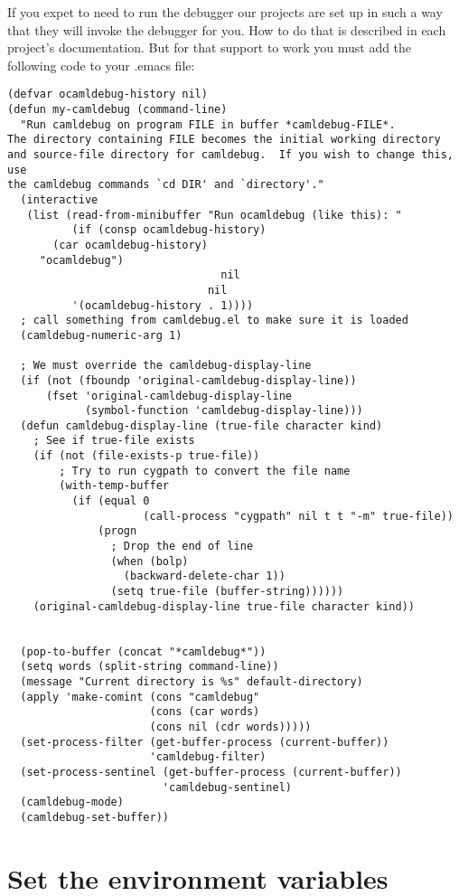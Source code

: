 \documentclass{article}
\begin{document}
 If you expet to need to run the debugger our projects are set up in such a
way that they will invoke the debugger for you. How to do that is described in
each project's documentation. But for that support to work you must add the
following code to your .emacs file:
\begin{verbatim}
(defvar ocamldebug-history nil)
(defun my-camldebug (command-line)
  "Run camldebug on program FILE in buffer *camldebug-FILE*.
The directory containing FILE becomes the initial working directory
and source-file directory for camldebug.  If you wish to change this, use
the camldebug commands `cd DIR' and `directory'."
  (interactive
   (list (read-from-minibuffer "Run ocamldebug (like this): "
          (if (consp ocamldebug-history)
       (car ocamldebug-history)
     "ocamldebug")
                                 nil
                               nil
          '(ocamldebug-history . 1))))
  ; call something from camldebug.el to make sure it is loaded
  (camldebug-numeric-arg 1)

  ; We must override the camldebug-display-line
  (if (not (fboundp 'original-camldebug-display-line))
      (fset 'original-camldebug-display-line 
            (symbol-function 'camldebug-display-line)))
  (defun camldebug-display-line (true-file character kind)
    ; See if true-file exists
    (if (not (file-exists-p true-file))
        ; Try to run cygpath to convert the file name
        (with-temp-buffer
          (if (equal 0 
                     (call-process "cygpath" nil t t "-m" true-file))
              (progn
                ; Drop the end of line
                (when (bolp)
                  (backward-delete-char 1))
                (setq true-file (buffer-string))))))
    (original-camldebug-display-line true-file character kind))


  (pop-to-buffer (concat "*camldebug*"))
  (setq words (split-string command-line)) 
  (message "Current directory is %s" default-directory)
  (apply 'make-comint (cons "camldebug"
                      (cons (car words)
                      (cons nil (cdr words)))))
  (set-process-filter (get-buffer-process (current-buffer))
                      'camldebug-filter)
  (set-process-sentinel (get-buffer-process (current-buffer))
                        'camldebug-sentinel)
  (camldebug-mode)
  (camldebug-set-buffer))
\end{verbatim}


\section{Set the environment variables}
\end{document}
